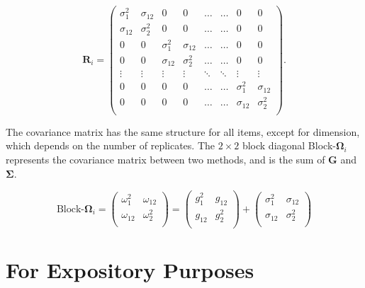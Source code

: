 \documentclass[12pt, a4paper]{report}
\theoremstyle{plain}
\theoremstyle{definition}
\theoremstyle{remark}
\begin{document}
\[ \boldsymbol{R}_i =\left(
\begin{array}{cccccccc}
\sigma^2_1  & \sigma_{12} & 0 & 0 & \ldots & \ldots & 0 & 0 \\
\sigma_{12} & \sigma^2_2  & 0 & 0  & \ldots & \ldots & 0 & 0\\

0 & 0 &\sigma^2_1  & \sigma_{12} & \ldots & \ldots& 0 &  0 \\
0 & 0 &\sigma_{12} & \sigma^2_2  & \ldots & \ldots & 0 & 0 \\
\vdots & \vdots &\vdots & \vdots & \ddots & \ddots& \vdots & \vdots \\

0 & 0 &0 & 0 & \ldots & \ldots&\sigma^2_1  & \sigma_{12} \\
0 & 0 &0 & 0 & \ldots & \ldots &\sigma_{12} & \sigma^2_2 \\
\end{array}
\right). \]

The covariance matrix has the same structure for all items, except for dimension, which depends on the number of replicates. The $2 \times 2$ block diagonal Block-$\boldsymbol{\Omega}_{i}$ represents the covariance matrix between two methods, and is the sum of $\boldsymbol{G}$ and $\boldsymbol{\Sigma}$.

\[ \textrm{Block-}\boldsymbol{\Omega}_{i}  = \left(\begin{array}{cc}
\omega^2_1  & \omega_{12} \\
\omega_{12} & \omega^2_2 \\
\end{array}  \right)
=  \left(
\begin{array}{cc}
g^2_1  & g_{12} \\
g_{12} & g^2_2 \\
\end{array} \right)+
\left(
\begin{array}{cc}
\sigma^2_1  & \sigma_{12} \\
\sigma_{12} & \sigma^2_2 \\
\end{array}\right)
\]



\section{For Expository Purposes}
\end{document}
